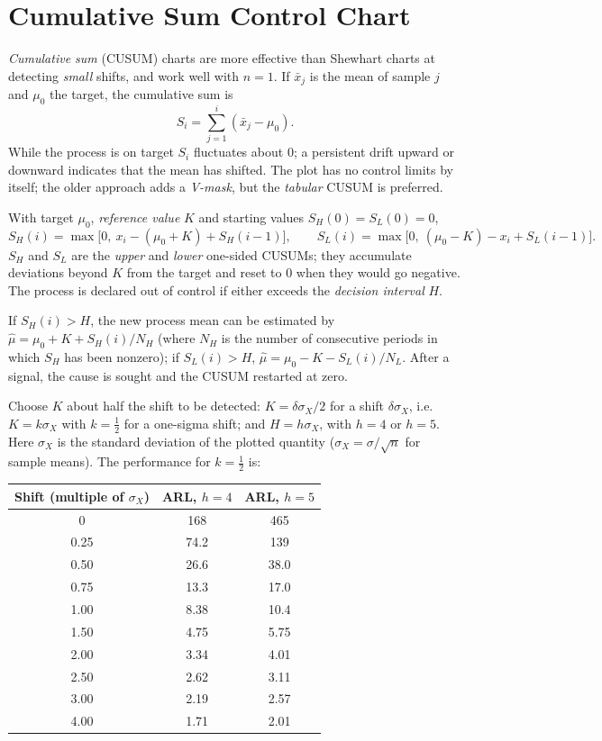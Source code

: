 \section{Cumulative Sum Control Chart}\label{sec:cusum}

\emph{Cumulative sum} (CUSUM) charts are more effective than Shewhart charts at detecting \emph{small} shifts, and work well with $n=1$. If $\bar{x}_j$ is the mean of sample $j$ and $\mu_0$ the target, the cumulative sum is
\[ S_i=\sum_{j=1}^i(\bar{x}_j-\mu_0). \]
While the process is on target $S_i$ fluctuates about $0$; a persistent drift upward or downward indicates that the mean has shifted. The plot has no control limits by itself; the older approach adds a \emph{V-mask}, but the \emph{tabular} CUSUM is preferred.

\begin{definition}
With target $\mu_0$, \emph{reference value} $K$ and starting values $S_H(0)=S_L(0)=0$,
\[ S_H(i)=\max\big[0,\ x_i-(\mu_0+K)+S_H(i-1)\big],\qquad S_L(i)=\max\big[0,\ (\mu_0-K)-x_i+S_L(i-1)\big]. \]
$S_H$ and $S_L$ are the \emph{upper} and \emph{lower} one-sided CUSUMs; they accumulate deviations beyond $K$ from the target and reset to $0$ when they would go negative. The process is declared out of control if either exceeds the \emph{decision interval} $H$.
\end{definition}

If $S_H(i)>H$, the new process mean can be estimated by $\hat\mu=\mu_0+K+S_H(i)/N_H$ (where $N_H$ is the number of consecutive periods in which $S_H$ has been nonzero); if $S_L(i)>H$, $\hat\mu=\mu_0-K-S_L(i)/N_L$. After a signal, the cause is sought and the CUSUM restarted at zero.

\begin{theorem}\label{thm:cusumdesign}
Choose $K$ about half the shift to be detected: $K=\delta\sigma_X/2$ for a shift $\delta\sigma_X$, i.e.\ $K=k\sigma_X$ with $k=\tfrac12$ for a one-sigma shift; and $H=h\sigma_X$, with $h=4$ or $h=5$. Here $\sigma_X$ is the standard deviation of the plotted quantity ($\sigma_X=\sigma/\sqrt n$ for sample means). The performance for $k=\tfrac12$ is:
\begin{center}
\begin{tabular}{c|cc}
\toprule
Shift (multiple of $\sigma_X$) & ARL, $h=4$ & ARL, $h=5$\\
\midrule
0 & 168 & 465\\
0.25 & 74.2 & 139\\
0.50 & 26.6 & 38.0\\
0.75 & 13.3 & 17.0\\
1.00 & 8.38 & 10.4\\
1.50 & 4.75 & 5.75\\
2.00 & 3.34 & 4.01\\
2.50 & 2.62 & 3.11\\
3.00 & 2.19 & 2.57\\
4.00 & 1.71 & 2.01\\
\bottomrule
\end{tabular}
\end{center}
\end{theorem}


